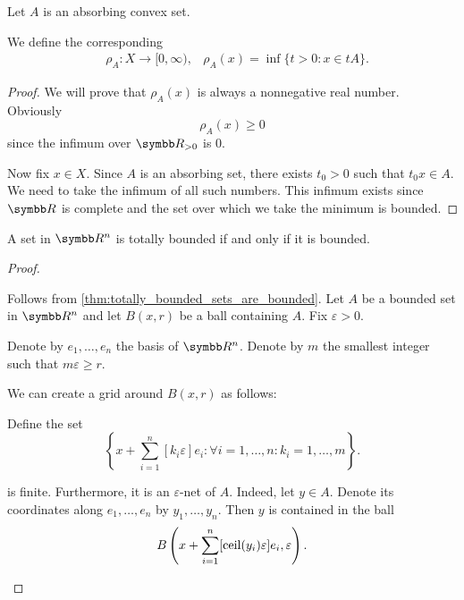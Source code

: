 \begin{definition}\label{def:minkowski_functional}
  Let \( A \) is an absorbing convex set.

  We define the corresponding 
  \begin{align*}
    &\rho_A: X \to [0, \infty),
    &\rho_A(x) = \inf \{ t > 0 \colon x \in tA \}.
  \end{align*}
\end{definition}
\begin{proof}
  We will prove that \( \rho_A(x) \) is always a nonnegative real number. Obviously
  \begin{equation*}
    \rho_A(x) \geq 0
  \end{equation*}
  since the infimum over \( \R_{>0} \) is \( 0 \).

  Now fix \( x \in X \). Since \( A \) is an absorbing set, there exists \( t_0 > 0 \) such that \( t_0 x \in A \). We need to take the infimum of all such numbers. This infimum exists since \( \R \) is complete and the set over which we take the minimum is bounded.
\end{proof}

\begin{proposition}\label{thm:rn_bounded_iff_totally_bounded}
  A set in \( \R^n \) is totally bounded if and only if it is bounded.
\end{proposition}
\begin{proof}
  \begin{description}
    \Implies Follows from \cref{thm:totally_bounded_sets_are_bounded}.
    \ImpliedBy Let \( A \) be a bounded set in \( \R^n \) and let \( B(x, r) \) be a ball containing \( A \). Fix \( \varepsilon > 0 \).

    Denote by \( e_1, \ldots, e_n \) the basis of \( \R^n \). Denote by \( m \) the smallest integer such that \( m \varepsilon \geq r \).

    We can create a grid around \( B(x, r) \) as follows:

    Define the set
    \begin{equation*}
      \left\{ x + \sum_{i=1}^n [k_i \varepsilon] e_i \colon \forall i = 1, \ldots, n: k_i = 1, \ldots, m \right\}.
    \end{equation*}

    is finite. Furthermore, it is an \( \varepsilon \)-net of \( A \). Indeed, let \( y \in A \). Denote its coordinates along \( e_1, \ldots, e_n \) by \( y_1, \ldots, y_n \). Then \( y \) is contained in the ball
    \begin{equation*}
      B\left(x + \sum_{i=1}^n [\operatorname{ceil}(y_i) \varepsilon] e_i, \varepsilon \right).
    \end{equation*}
  \end{description}
\end{proof}

